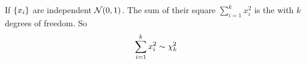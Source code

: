 \begin{definition}
    If $\set{x_i}$ are independent $\normaldistribution{0}{1}$. The sum of their square $\sum_{i=1}^k x_i^2$ is the  with $k$ degrees of freedom. So
    \begin{equation}
        \sum_{i=1}^k x_i^2 \sim \chi^2_{k}
    \end{equation}
\end{definition}




































































































